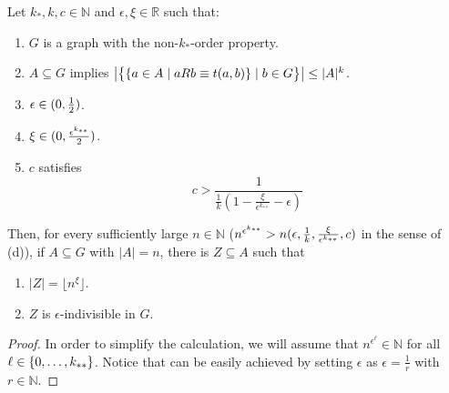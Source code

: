     \begin{lemma}[Claim 4.21] \label{lem:many_values_to_equitative_partition_with_bound_exceptional_pairs}
        Let $k_*, k, c \in \mathbb{N}$ and $\epsilon, \xi \in \mathbb{R}$ such that:
        \begin{enumerate}
            \item\label{itm:many_values_to_equitative_partition_with_bound_exceptional_pairs.1} $G$ is a graph with the non-$k_*$-order property.
            \item\label{itm:many_values_to_equitative_partition_with_bound_exceptional_pairs.2} $A \subseteq G$ implies $\bigl| \bigl\{ \{  a \in A \mid a R b \equiv t(a,b) \} \mid b \in G \bigr\} \bigr|
                \leq |A|^k$.
            \item\label{itm:many_values_to_equitative_partition_with_bound_exceptional_pairs.3} $\epsilon \in ( 0, \frac{1}{2} )$.
            \item\label{itm:many_values_to_equitative_partition_with_bound_exceptional_pairs.4} $\xi \in ( 0, \frac{\epsilon^{k_{**}}}{2} )$.
            \item\label{itm:many_values_to_equitative_partition_with_bound_exceptional_pairs.5} $c$ satisfies \[
                c > \frac{1}{\frac{1}{k} (1 - \frac{\xi}{\epsilon^{k_{**}}} - \epsilon)}
            \]
        \end{enumerate}
        Then, for every sufficiently large $n \in \mathbb{N}$ ($n^{\epsilon^{k_{**}}} > n( \epsilon, \frac{1}{k},
        \frac{\xi}{\epsilon^{k_{**}}}, c )$ in the sense of  (d)), if
        $A \subseteq G$ with $|A| = n$, there is $Z \subseteq A$ such that
        \begin{enumerate}[label=(\alph*), ref=\alph*]
            \item\label{itm:many_values_to_equitative_partition_with_bound_exceptional_pairs.a} $|Z| = \lfloor n^\xi \rfloor$.
            \item\label{itm:many_values_to_equitative_partition_with_bound_exceptional_pairs.b} $Z$ is $\epsilon$-indivisible in $G$.
        \end{enumerate}
        \begin{proof}
            In order to simplify the calculation, we will assume that $n^{\epsilon^\ell} \in \mathbb{N}$ for all
            $\ell \in \{ 0, \dots, k_{**} \}$.
            Notice that can be easily achieved by setting $\epsilon$ as $\epsilon = \frac{1}{r}$ with $r \in \mathbb{N}$.

\end{proof}
\end{lemma}

